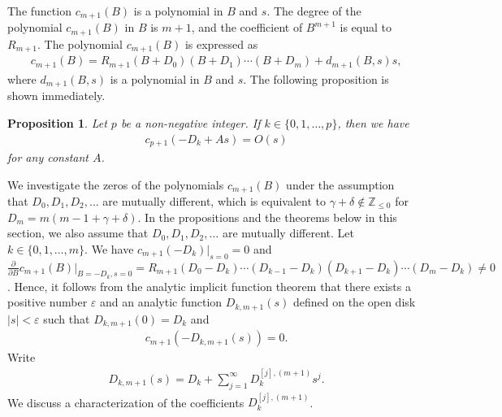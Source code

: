 \documentclass[12pt]{amsart}
\newcommand{\Zint}{\mathbb {Z}}
\numberwithin{equation}{section}
\newtheorem{prop}[thm]{Proposition}
\theoremstyle{definition}
\theoremstyle{remark}
\begin{document}
The function $c_{m+1} (B) $ is a polynomial in $B$ and $s$.
The degree of the polynomial $c_{m+1} (B)$ in $B$ is $m+1$, and the coefficient of $B^{m+1}$ is equal to $R_{m+1}$.
The polynomial $c_{m+1} (B)$ is expressed as 
\begin{align}
& c_{m+1} (B) =  R_{m+1} (B+D_0) (B+D_1 ) \cdots (B+D_{m}) + d_{m+1} (B,s) s , \label{eq:cm012} 
\end{align}
where $d_{m+1} (B,s)$ is a polynomial in $B$ and $s$.
The following proposition is shown immediately.
\begin{prop}\label{prop1}
Let $p$ be a non-negative integer.
If $k\in \{  0, 1, \dots ,p \}$, then we have
\begin{align}
& c_{p+1}(-D_{k} +As)= O(s)
\end{align}
for any constant $A$.
\end{prop}
We investigate the zeros of the polynomials $c_{m+1} (B) $ under the assumption that $D_0, D_1, D_2, \dots $ are mutually different, which is equivalent to $\gamma + \delta \not \in \Zint _{\leq 0} $ for $D_{m}= m(m-1+\gamma+\delta) $.
In the propositions and the theorems below in this section, we also assume that $D_0, D_1, D_2, \dots $ are mutually different.
Let $k \in \{ 0,1, \dots ,m \}$.
We have $c_{m+1} (-D_k) | _{s=0} =0 $ and $\frac{\partial }{\partial B} c_{m+1} (B) | _{B=-D_k, s=0} = R_{m+1} (D_0 -D_k) \cdots (D_{k-1} -D_k) (D_{k+1} -D_k) \cdots (D_{m} -D_k) \neq 0$.
Hence, it follows from the analytic implicit function theorem that there exists a positive number $\varepsilon $ and an analytic function $D_{k,m+1} (s) $ defined on the open disk $|s|< \varepsilon $ such that $D_{k,m+1} (0)  = D_k  $ and
\begin{align}
& c_{m+1} (-D_{k,m+1} (s) ) =0. 
\label{eq:cmDm}
\end{align}
Write
\begin{align}
& D_{k,m+1} (s) = D_k + \sum _{j=1}^{\infty } D_k^{[j],(m+1)} s^j .
\end{align}
We discuss a characterization of the coefficients $D_k^{[j],(m+1)} $.
\end{document}
